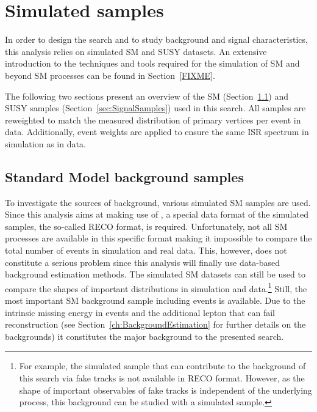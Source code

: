 \FloatBarrier
\chapter{Simulated samples}
\label{sec:SimulatedSamples}

In order to design the search and to study background and signal characteristics, this analysis relies on simulated  SM and SUSY datasets.
An extensive introduction to the techniques and tools required for the simulation of SM and beyond SM processes can be found in Section~\ref{FIXME}.

The following two sections present an overview of the SM (Section~\ref{sec:SMSamples}) and SUSY samples (Section~\ref{sec:SignalSamples}) used in this search.
All samples are reweighted to match the measured distribution of primary vertices per event in data.
Additionally, event weights are applied to ensure the same ISR spectrum in simulation as in data.

\section{Standard Model background samples}
\label{sec:SMSamples}
To investigate the sources of background, various simulated SM samples are used.
Since this analysis aims at making use of \dedx, a special data format of the simulated samples, the so-called RECO format, is required.
Unfortunately, not all SM processes are available in this specific format making it impossible to compare the total number of events in simulation and real data.
This, however, does not constitute a serious problem since this analysis will finally use data-based background estimation methods.
The simulated SM datasets can still be used to compare the shapes of important distributions in simulation and data.\footnote{For example, the simulated \ZInvJets sample that can contribute to the background of this search via fake tracks is not available in RECO format. However, as the shape of important observables of fake tracks is independent of the underlying process, this background can be studied with a simulated \WJets sample.}
Still, the most important SM background sample including \WJets events is available.
Due to the intrinsic missing energy in \WJets events and the additional lepton that can fail reconstruction (see Section~\ref{ch:BackgroundEstimation} for further details on the backgrounds) it constitutes the major background to the presented search. 

